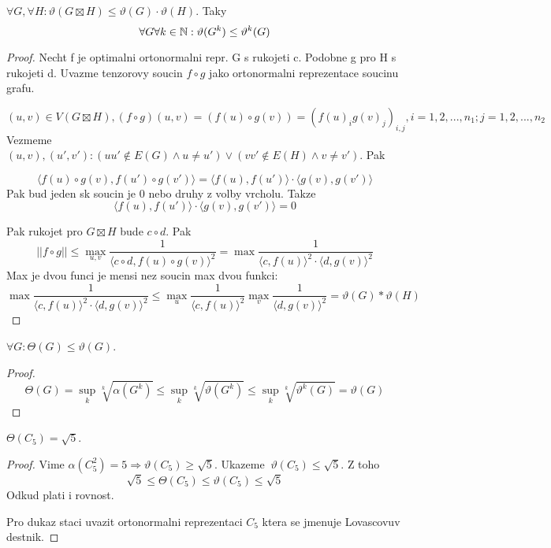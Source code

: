 \begin{lemma}
	$\forall G, \forall H: \vartheta(G \boxtimes H) \leq \vartheta(G) \cdot \vartheta(H)$. Taky
	\[ \forall G \forall k \in \operatorname{\mathbb{N}}: \vartheta(G^k) \leq \vartheta^k(G) \]
\end{lemma}
\begin{proof}
	Necht f je optimalni ortonormalni repr. G s rukojeti c. Podobne g pro H s rukojeti d. Uvazme tenzorovy soucin $f \circ g$ jako ortonormalni reprezentace soucinu grafu.

	\[ (u, v) \in V(G \boxtimes H), (f \circ g) (u, v) = (f(u) \circ g(v)) = (f(u)_i g(v)_j)_{i, j}, i = 1, 2, ..., n_1; j = 1,2, ..., n_2\]
	Vezmeme $(u, v), (u', v'): (uu' \notin E(G) \land u \ne u') \lor (vv' \notin E(H) \land v \ne v') $. Pak

	\[ \langle f(u) \circ g(v), f(u') \circ g(v') \rangle = \langle f(u), f(u') \rangle \cdot \langle g(v), g(v') \rangle \]
	Pak bud jeden sk soucin je 0 nebo druhy z volby vrcholu. Takze
	\[ \langle f(u), f(u') \rangle \cdot \langle g(v), g(v') \rangle = 0 \]

	Pak rukojet pro $G \boxtimes H$ bude $c \circ d$. Pak
	\[ || f \circ g || \leq \max_{u, v} \frac{1}{\langle c \circ d, f(u) \circ g(v) \rangle^2} = \max \frac{1}{\langle c, f(u) \rangle^2 \cdot \langle d, g(v) \rangle^2} \]
	Max je dvou funci je mensi nez soucin max dvou funkci:
	\[ \max \frac{1}{\langle c, f(u) \rangle^2 \cdot \langle d, g(v) \rangle^2} \leq \max_u \frac{1}{\langle c, f(u) \rangle^2} \max_v \frac{1}{\langle d, g(v) \rangle^2} = \vartheta(G) * \vartheta(H) \]
\end{proof}

\begin{lemma}
	$\forall G : \Theta(G) \leq \vartheta(G)$.
\end{lemma}
\begin{proof}
	\[ \Theta(G) = \sup_k \sqrt[k]{\alpha(G^k)} \leq \sup_k \sqrt[k]{\vartheta(G^k)} \leq \sup_k \sqrt[k]{\vartheta^k(G)} = \vartheta(G) \]

\end{proof}

\begin{theorem}
	$ \Theta(C_5) = \sqrt{5}$.
\end{theorem}
\begin{proof}
	Vime $ \alpha(C_5^2) = 5 \Rightarrow \vartheta(C_5) \geq \sqrt{5} $. Ukazeme $\ \vartheta(C_5) \leq \sqrt{5}$. Z toho
	\[ \sqrt{5} \leq \Theta(C_5) \leq \vartheta(C_5) \leq \sqrt{5} \]
	Odkud plati i rovnost.

	Pro dukaz staci uvazit ortonormalni reprezentaci $C_5$ ktera se jmenuje Lovascovuv destnik.
\end{proof}

